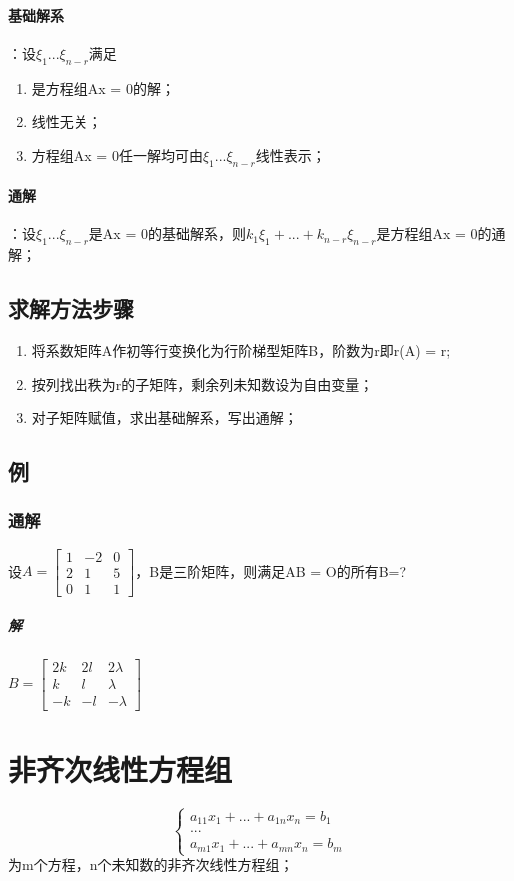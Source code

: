 \paragraph{基础解系}
：设\(\xi_1...\xi_{n - r}\)满足\begin{enumerate}
    \item 是方程组Ax = 0的解；
    \item 线性无关；
    \item 方程组Ax = 0任一解均可由\(\xi_1...\xi_{n - r}\)线性表示；
\end{enumerate}

\paragraph{通解}
：设\(\xi_1...\xi_{n - r}\)是Ax = 0的基础解系，则\(k_1\xi_1 + ... + k_{n - r}\xi_{n - r}\)是方程组Ax = 0的通解；

\subsection{求解方法步骤}
\begin{enumerate}
    \item 将系数矩阵A作初等行变换化为行阶梯型矩阵B，阶数为r即r(A) = r;
    \item 按列找出秩为r的子矩阵，剩余列未知数设为自由变量；
    \item 对子矩阵赋值，求出基础解系，写出通解；
\end{enumerate}


\subsection{例}

\subsubsection{通解}
设\(A = \begin{bmatrix}
    1 & -2 & 0 \\ 
    2 & 1 & 5 \\ 
    0 & 1 & 1
\end{bmatrix}\)，B是三阶矩阵，则满足AB = O的所有B=?
\subparagraph{解}
\(B = \begin{bmatrix}
    2k & 2l & 2\lambda \\ 
    k & l & \lambda \\ 
    -k & -l & -\lambda
\end{bmatrix}\)


\section{非齐次线性方程组}
\[\begin{cases}
    a_{11}x_1 + ... + a_{1n}x_n = b_1 \\ 
    ... \\ 
    a_{m1}x_1 + ... + a_{mn}x_n = b_m
\end{cases}\]
为m个方程，n个未知数的非齐次线性方程组；

